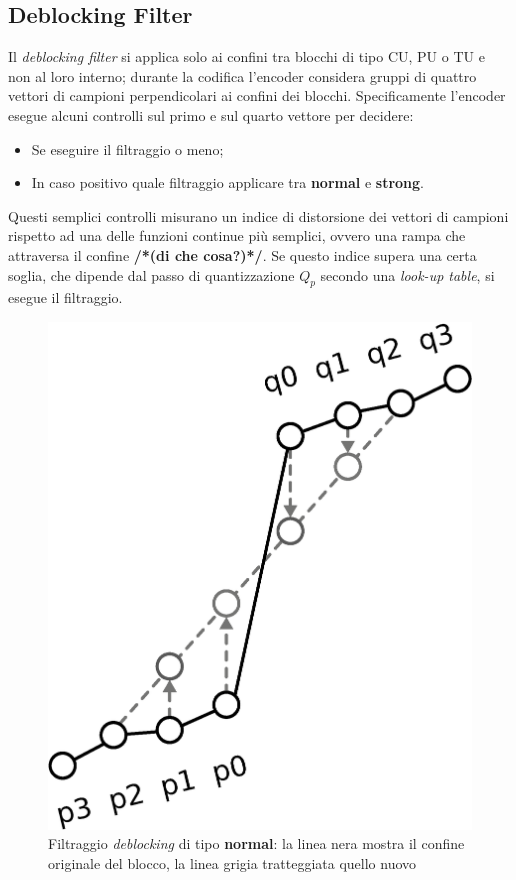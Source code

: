 \subsection{Deblocking Filter}
Il \emph{deblocking filter} si applica solo ai confini tra blocchi di tipo CU, 
PU o TU e non al loro interno; durante la codifica  l'encoder considera gruppi 
di quattro vettori di campioni perpendicolari ai confini dei blocchi. 
Specificamente l'encoder esegue alcuni controlli sul primo e sul quarto vettore 
per decidere:
\begin{itemize}
\item Se eseguire il filtraggio o meno;
\item In caso positivo quale filtraggio applicare tra \textbf{normal} e 
\textbf{strong}.
\end{itemize}
Questi semplici controlli misurano un indice di distorsione dei vettori di 
campioni rispetto ad una delle funzioni continue più semplici, ovvero una rampa 
che attraversa il confine \textbf{/*(di che cosa?)*/}. Se questo indice supera 
una certa soglia, che dipende dal passo di quantizzazione $Q_p$ secondo una 
\emph{look-up table}, si esegue il filtraggio.

\begin{figure}[H]
  \captionsetup{justification=raggedright}
  \centering
  \includegraphics[scale=0.45]{Figures/Deblocking_filter}
    \caption[Filtraggio \emph{deblocking} di tipo \textbf{normal}]
    {Filtraggio \emph{deblocking} di tipo \textbf{normal}: la linea nera mostra
      il confine originale del blocco, la linea grigia tratteggiata quello 
      nuovo}
\end{figure}

